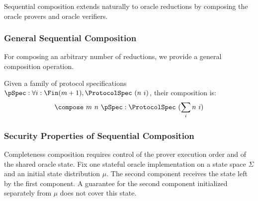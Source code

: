 \begin{definition}
    \label{def:oracle_reduction_append}
    Sequential composition extends naturally to oracle reductions by composing the oracle provers and oracle verifiers.
\end{definition}

\subsubsection{General Sequential Composition}

For composing an arbitrary number of reductions, we provide a general composition operation.

\begin{definition}
    \label{def:protocol_spec_compose}
    Given a family of protocol specifications $\pSpec : \forall i : \Fin(m+1), \ProtocolSpec\ (n\ i)$, their composition is:
    \[ \compose\ m\ n\ \pSpec : \ProtocolSpec\ (\sum_{i} n\ i) \]
\end{definition}

\begin{definition}
    \label{def:prover_compose}
\end{definition}

\begin{definition}
    \label{def:verifier_compose}
\end{definition}

\begin{definition}
    \label{def:reduction_compose}
\end{definition}

\subsubsection{Security Properties of Sequential Composition}

Completeness composition requires control of the prover execution order and of the shared
oracle state. Fix one stateful oracle implementation on a state space $\Sigma$ and an initial
state distribution $\mu$. The second component receives the state left by the first component.
A guarantee for the second component initialized separately from $\mu$ does not cover this state.

